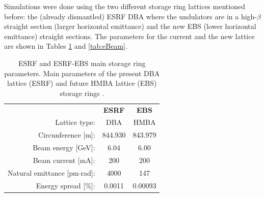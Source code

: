 \documentclass{iucr}              %
\begin{document}
\begin{table}\label{tab:Positions}
    \caption{Position of the main ID16A optical elements with respect to the source (undulator centre). It also shows the values for horizontal and vertical demagnification $M^{-1}=p/q$, where $p$ and $q$ are the the distances object-optics and optics-image, respectively.}
\end{table}


Simulations were done using the two different storage ring lattices mentioned before: the (already dismantled) ESRF DBA where the undulators are in a high-$\beta$ straight section (larger horizontal emittance) and the new EBS (lower horizontal emittance) straight sections. The parameters for the current and the new lattice are shown in Tables \ref{tab:TableSources} and \ref{tab:eBeam}.

\begin{table}\label{tab:TableSources}
    \caption{ESRF and ESRF-EBS main storage ring parameters. Main parameters of the present DBA lattice (ESRF) and future HMBA lattice (EBS) storage rings \cite{orangebook}.}
        \begin{tabular}{rcc}
                                              & \textbf{ESRF} & \textbf{EBS}      \\ 
        Lattice type:                         & DBA           & HMBA              \\
        Circunference {[}m{]}:                & 844.930       & 843.979           \\
        Beam energy {[}GeV{]}:                & 6.04          & 6.00              \\
        Beam current {[}mA{]}:                & 200           & 200               \\
        Natural emittance {[}pm$\cdot$rad{]}: & 4000          & 147               \\
        Energy spread {[}$\%${]}:             & 0.0011        & 0.00093           \\       
    \end{tabular}
\end{table}
\end{document}
